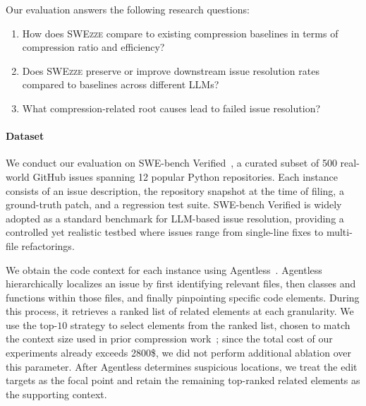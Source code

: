 \documentclass[sigconf,nonacm]{acmart}
\newcommand{\projName}{\textsc{SWEzze}\xspace}
\begin{document}

Our evaluation answers the following research questions:

\begin{enumerate}
    \item[\textbf{RQ1}] How does \projName compare to existing compression baselines in terms of compression ratio and  efficiency?

    \item[\textbf{RQ2}] Does \projName preserve or improve downstream issue resolution rates compared to baselines across different LLMs?

    \item[\textbf{RQ3}] What compression-related root causes lead to failed issue resolution?
\end{enumerate}



\paragraph*{Dataset} We conduct our evaluation on SWE-bench Verified~\cite{jimenez2023swe}, a curated subset of 500 real-world GitHub issues spanning 12 popular Python repositories. Each instance consists of an issue description, the repository snapshot at the time of filing, a ground-truth patch, and a regression test suite. SWE-bench Verified is widely adopted as a standard benchmark for LLM-based issue resolution, providing a controlled yet realistic testbed where issues range from single-line fixes to multi-file refactorings.

We obtain the code context for each instance using Agentless~\cite{xia2024agentless}. Agentless hierarchically localizes an issue by first identifying relevant files, then classes and functions within those files, and finally pinpointing specific code elements. During this process, it retrieves a ranked list of related elements at each granularity. We use the top-$10$ strategy to select elements from the ranked list, chosen to match the context size used in prior compression work~\cite{shi2025longcodezip}; since the total cost of our experiments already exceeds 2800\$, we did not perform additional ablation over this parameter. After Agentless determines suspicious locations, we treat the edit targets as the focal point and retain the remaining top-ranked related elements as the supporting context.
\end{document}
